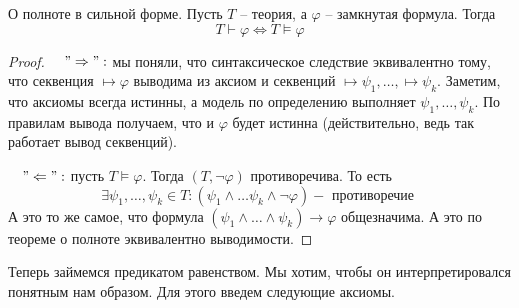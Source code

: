 \begin{theorem}
    О полноте в сильной форме. Пусть $T$ -- теория, а $\varphi$ -- замкнутая формула. Тогда \[ T \vdash \varphi \Longleftrightarrow T \vDash \varphi \]
\end{theorem}
\begin{proof} \quad

    $\quad "\Rightarrow":$ мы поняли, что синтаксическое следствие эквивалентно тому, что секвенция $\mapsto \varphi$ выводима из аксиом и секвенций $\mapsto \psi_1, \dots, \mapsto \psi_k$. Заметим, что аксиомы всегда истинны, а модель по определению выполняет $\psi_1, \dots, \psi_k$. По правилам вывода получаем, что и $\varphi$ будет истинна (действительно, ведь так работает вывод секвенций).

    $\quad "\Leftarrow":$ пусть $T \vDash \varphi$. Тогда $(T, \lnot \varphi)$ противоречива. То есть \[ \exists \psi_1, \dots, \psi_k \in T : (\psi_1 \land \dots \psi_k \land \lnot \varphi) - \text{ противоречие } \]
    А это то же самое, что формула $(\psi_1 \land \dots \land \psi_k) \to \varphi$ общезначима. А это по теореме о полноте эквивалентно выводимости.
\end{proof}

Теперь займемся предикатом равенством. Мы хотим, чтобы он интерпретировался понятным нам образом. Для этого введем следующие аксиомы.

